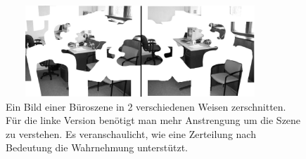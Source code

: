 \begin{figure}
	\centering
	\includegraphics[width=0.9\textwidth, height=130px]{pics/est.jpg}	
	\caption{Ein Bild einer Büroszene in 2 verschiedenen Weisen zerschnitten. Für die linke Version benötigt man mehr Anstrengung um die Szene zu verstehen. Es veranschaulicht, wie eine Zerteilung nach Bedeutung die Wahrnehmung unterstützt. \cite{bib:est}}
	\label{img:est}
\end{figure}
